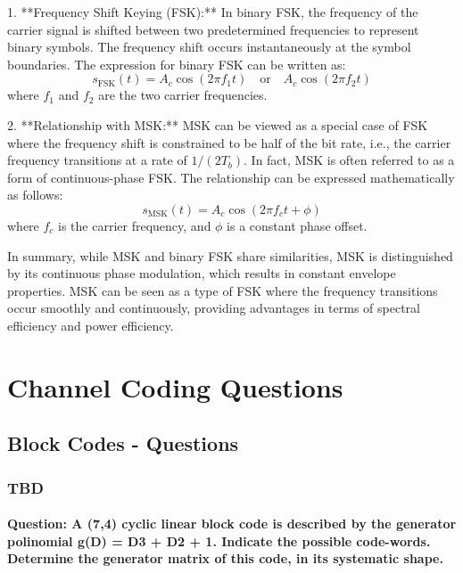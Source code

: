 \documentclass[colorlinks,11pt,a4paper,normalphoto,withhyper,ragged2e]{altareport}
\begin{document}
				1. **Frequency Shift Keying (FSK):**
				In binary FSK, the frequency of the carrier signal is shifted between two predetermined frequencies to represent binary symbols. The frequency shift occurs instantaneously at the symbol boundaries. The expression for binary FSK can be written as:
				\[ s_{\text{FSK}}(t) = A_c \cos\left(2\pi f_1 t\right) \quad \text{or} \quad A_c \cos\left(2\pi f_2 t\right) \]
				where \(f_1\) and \(f_2\) are the two carrier frequencies.
				
				2. **Relationship with MSK:**
				MSK can be viewed as a special case of FSK where the frequency shift is constrained to be half of the bit rate, i.e., the carrier frequency transitions at a rate of \(1/(2T_b)\). In fact, MSK is often referred to as a form of continuous-phase FSK. The relationship can be expressed mathematically as follows:
				\[ s_{\text{MSK}}(t) = A_c \cos\left(2\pi f_c t + \phi\right) \]
				where \(f_c\) is the carrier frequency, and \(\phi\) is a constant phase offset.
				
				In summary, while MSK and binary FSK share similarities, MSK is distinguished by its continuous phase modulation, which results in constant envelope properties. MSK can be seen as a type of FSK where the frequency transitions occur smoothly and continuously, providing advantages in terms of spectral efficiency and power efficiency.
				
		
		
		\pagebreak
	
			
		
		
	\section{Channel Coding Questions}
	
		\subsection{Block Codes - Questions}
			
			\subsubsection{TBD}
				
				
				\paragraph{Question: A (7,4) cyclic linear block code is described by the generator polinomial g(D) = D3 + D2 + 1. Indicate the possible code-words. Determine the generator matrix of this code, in its systematic shape.}
\end{document}
